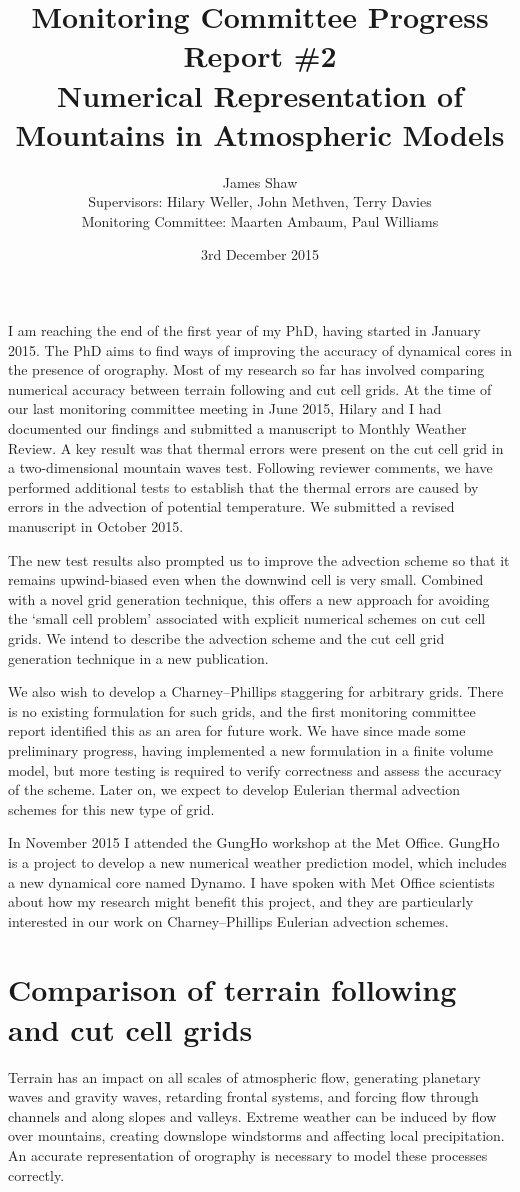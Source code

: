\documentclass[a4paper]{article}
\title{Monitoring Committee Progress Report \#2\\
\vspace*{1em}
\Large{Numerical Representation of Mountains in Atmospheric Models}}
\author{James Shaw
\vspace{0.5em} \\
\large{Supervisors: Hilary Weller, John Methven, Terry Davies}
\vspace{0.5em} \\
\large{Monitoring Committee: Maarten Ambaum, Paul Williams}}
\date{3rd December 2015}
\begin{document}
\newcommand{\exner}{\Pi}
\maketitle


I am reaching the end of the first year of my PhD, having started in January 2015.
The PhD aims to find ways of improving the accuracy of dynamical cores in the presence of orography.
Most of my research so far has involved comparing numerical accuracy between terrain following and cut cell grids.
At the time of our last monitoring committee meeting in June 2015, Hilary and I had documented our findings and submitted a manuscript to Monthly Weather Review.  A key result was that thermal errors were present on the cut cell grid in a two-dimensional mountain waves test.  Following reviewer comments, we have performed additional tests to establish that the thermal errors are caused by errors in the advection of potential temperature.  We submitted a revised manuscript in October 2015.

The new test results also prompted us to improve the advection scheme so that it remains upwind-biased even when the downwind cell is very small.  Combined with a novel grid generation technique, this offers a new approach for avoiding the `small cell problem' associated with explicit numerical schemes on cut cell grids.  We intend to describe the advection scheme and the cut cell grid generation technique in a new publication.

We also wish to develop a Charney--Phillips staggering for arbitrary grids.  There is no existing formulation for such grids, and the first monitoring committee report identified this as an area for future work.  We have since made some preliminary progress, having implemented a new formulation in a finite volume model, but more testing is required to verify correctness and assess the accuracy of the scheme.  Later on, we expect to develop Eulerian thermal advection schemes for this new type of grid.

In November 2015 I attended the GungHo workshop at the Met Office.  GungHo is a project to develop a new numerical weather prediction model, which includes a new dynamical core named Dynamo.  I have spoken with Met Office scientists about how my research might benefit this project, and they are particularly interested in our work on Charney--Phillips Eulerian advection schemes.

\section{Comparison of terrain following and cut cell grids}
Terrain has an impact on all scales of atmospheric flow, generating planetary waves and gravity waves, retarding frontal systems, and forcing flow through channels and along slopes and valleys.  Extreme weather can be induced by flow over mountains, creating downslope windstorms and affecting local precipitation.  An accurate representation of orography is necessary to model these processes correctly.
\end{document}
